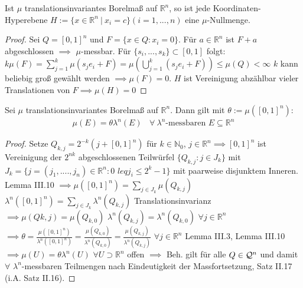   \begin{lemma}
    Ist $\mu$ translationsinvariantes Borelmaß auf $\mathbb{R}^n$, so ist jede Koordinaten-Hyperebene $H := \{x \in \mathbb{R}^n \ | \ x_i = c\} (i=1,...,n)$ eine $\mu$-Nullmenge.
  \end{lemma}

  \begin{proof}
      Sei $Q = [0,1]^n$ und $F = \{x\in Q: x_i = 0\}$. Für $a\in\mathbb{R}^n$ ist $F+a$ abgeschlossen $\implies$ $\mu$-messbar. Für $\{s_i, ..., s_k\} \subset [0,1]$ folgt: \newline $k\mu(F) = \sum\limits_{j=1}^{k}\mu(s_j e_i + F) = \mu(\bigcup\limits_{j=1}^{k}(s_j e_i + F)) \leq \mu(Q) < \infty$  \newline
$k$ kann beliebig groß gewählt werden $\implies \mu(F) = 0$. \newline
$H$ ist Vereinigung abzählbar vieler Translationen von $F \implies \mu(H) = 0$
  \end{proof}

  \begin{theorem}
    Sei $\mu$ translationsinvariantes Borelmaß auf $\mathbb{R}^n$. Dann gilt mit $\theta := \mu([0,1]^n)$:
    \begin{align*}
      \mu(E) = \theta \lambda^n(E) \ \ \ \ \forall \ \lambda^n \text{-messbaren } E \subseteq \mathbb{R}^n
    \end{align*}
  \end{theorem}

    \begin{proof}
	Setze $Q_{k,j} = 2^{-k}(j+[0,1]^n)$ für $k\in\mathbb{N}_0$, $j\in\mathbb{R}^n \implies [0,1]^n$ ist Vereinigung der $2^{nk}$ abgeschlossenen Teilwürfel $\{Q_{k,j}: j\in J_k\}$ mit $J_k = \{j = (j_1, ...., j_n) \in \mathbb{R}^n: 0$ $leq j_i \leq 2^k-1\}$ mit paarweise disjunktem Inneren. Lemma III.10 \newline  $\implies \mu([0,1]^n) = \sum\limits_{j\in J_k} \mu(Q_{k,j})$ \newline
	$\lambda^n([0,1]^n) = \sum\limits_{j\in J_k} \lambda^n(Q_{k,j})$ \newline
	Translationsinvarianz $\implies \mu(Q{k,j}) = \mu(Q_{k,0})$ \newline
	$\lambda^n(Q_{k,j}) = \lambda^n(Q_{k,0})$ $\forall  j\in \mathbb{R}^n$ \newline
	$\implies \theta = \frac{\mu([0,1]^n)}{\lambda^n([0,1]^n)} = \frac{\mu(Q_{k,0})}{\lambda^n(Q_{k,0})} = \frac{\mu(Q_{k,j})}{\lambda^n(Q_{k,j})}$ $\forall j\in \mathbb{R}^n$ \newline
	Lemma III.3, Lemma III.10 $\implies \mu(U) = \theta \lambda^n(U)$ $\forall U\supset \mathbb{R}^n$ offen \newline
	$\implies$ Beh. gilt für alle $Q \in \mathcal{Q}^n$ und damit $\forall$ $\lambda^n$-messbaren Teilmengen nach Eindeutigkeit der Massfortsetzung, Satz II.17 (i.A. Satz II.16). 
\end{proof}

